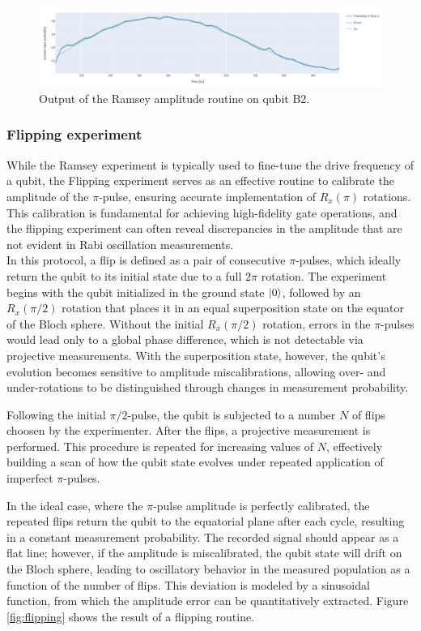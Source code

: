 \begin{figure}[h!]
    \centering
    \includegraphics[width=\textwidth]{figures/png/ramsey.png}
    \caption{Output of the Ramsey amplitude routine on qubit B2.}
    \label{fig:ramsey}
\end{figure}

\subsubsection{Flipping experiment}

While the Ramsey experiment is typically used to fine-tune the drive frequency of a qubit, the Flipping experiment serves as an effective routine to calibrate the amplitude of the $\pi$-pulse, ensuring accurate implementation of $R_x(\pi)$ rotations. 
This calibration is fundamental for achieving high-fidelity gate operations, and the flipping experiment can often reveal discrepancies in the amplitude that are not evident in Rabi oscillation measurements.\\
In this protocol, a flip is defined as a pair of consecutive $\pi$-pulses, which ideally return the qubit to its initial state due to a full $2\pi$ rotation. 
The experiment begins with the qubit initialized in the ground state $\ket{0}$, followed by an $R_x(\pi/2)$ rotation that places it in an equal superposition state on the equator of the Bloch sphere. 
Without the initial $R_x(\pi/2)$ rotation, errors in the $\pi$-pulses would lead only to a global phase difference, which is not detectable via projective measurements. 
With the superposition state, however, the qubit's evolution becomes sensitive to amplitude miscalibrations, allowing over- and under-rotations to be distinguished through changes in measurement probability.

Following the initial $\pi/2$-pulse, the qubit is subjected to a number $N$ of flips choosen by the experimenter. 
After the flips, a projective measurement is performed. This procedure is repeated for increasing values of $N$, effectively building a scan of how the qubit state evolves under repeated application of imperfect $\pi$-pulses.

In the ideal case, where the $\pi$-pulse amplitude is perfectly calibrated, the repeated flips return the qubit to the equatorial plane after each cycle, resulting in a constant measurement probability. 
The recorded signal should appear as a flat line; however, if the amplitude is miscalibrated, the qubit state will drift on the Bloch sphere, leading to oscillatory behavior in the measured population as a function of the number of flips. 
This deviation is modeled by a sinusoidal function, from which the amplitude error can be quantitatively extracted.
Figure \ref{fig:flipping} shows the result of a flipping routine.

